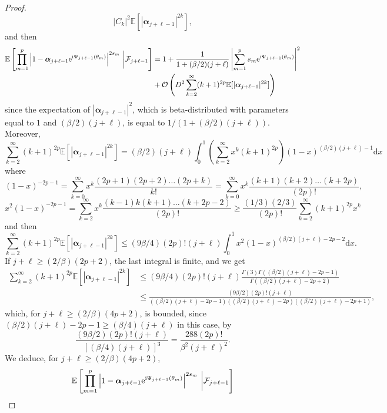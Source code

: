 \documentclass[]{article}
\begin{document}
\begin{proof}
$$|C_k|^2 \mathbb{E}[ |\boldsymbol{\alpha}_{j+\ell-1} |^{2k} ],$$
and then 
\begin{align*}\mathbb{E} \left[ \prod_{m=1}^p \left| 1 -  \boldsymbol{\alpha}_{j+\ell-1} \mathrm{e}^{\textnormal{i} \Psi_{j+ \ell - 1} (\theta_m) }\right|^{2s_m} \, \bigg| \mathcal{F}_{j+ \ell-1} \right] 
& = 1 + \frac{1}{ 1 + (\beta/2)(j+\ell)} \left|\sum_{m=1}^{p} s_m \mathrm{e}^{\textnormal{i} \Psi_{j+ \ell - 1} (\theta_m) }\right|^2
\\ & + \mathcal{O} \left( D^2 \sum_{k=2}^{\infty}
(k+1)^{2p} \mathbb{E}[ |\boldsymbol{\alpha}_{j+\ell-1} |^{2k}]
\right)
\end{align*}
since the expectation of 
$|\boldsymbol{\alpha}_{j+\ell-1}|^2$, which is beta-distributed with parameters equal to $1$ and $(\beta/2)(j+\ell)$, is equal to $1/ (1 + (\beta/2)(j+\ell))$. 
Moreover, 
$$\sum_{k=2}^{\infty} (k+1)^{2p}
 \mathbb{E}[ |\boldsymbol{\alpha}_{j+\ell-1} |^{2k}]
 = (\beta/2)(j+\ell) 
 \int_0^1 \left(\sum_{k = 2}^{\infty} x^k (k+1)^{2p}\right)  (1-x)^{(\beta/2)(j+\ell)  - 1}  \mathrm{d}x
$$
where 
$$(1-x)^{-2p-1}
= \sum_{k=0}^{\infty} x^k
\frac{(2p+1)(2p+2) \dots (2p+k)}{k!}
= \sum_{k=0}^{\infty} x^k
\frac{(k+1)(k+2) \dots (k+2p)}{(2p)!},
$$
$$x^2 (1-x)^{-2p-1} = 
\sum_{k=2}^{\infty} x^k
\frac{(k-1)k(k+1) \dots (k+2p-2)}{(2p)!}
\geq \frac{(1/3)(2/3)}{(2p)!}
\sum_{k=2}^{\infty} (k+1)^{2p} x^k
$$
and then
$$\sum_{k=2}^{\infty} (k+1)^{2p}
 \mathbb{E}[ |\boldsymbol{\alpha}_{j+\ell-1} |^{2k}]
 \leq (9 \beta/4) (2p)! (j+\ell) 
 \int_0^{1} x^2 (1 - x)^{(\beta/2)(j+\ell) - 2p-2} \mathrm{d}x.
 $$
If $j + \ell \geq (2/\beta)(2p+2)$, the last integral is finite, and 
we get 
\begin{align*}\sum_{k=2}^{\infty} (k+1)^{2p}
 \mathbb{E}[ |\boldsymbol{\alpha}_{j+\ell-1} |^{2k}]
 & \leq (9 \beta/4) (2p)! (j+\ell)  
 \frac{ \Gamma(3) \Gamma((\beta/2)(j+\ell) - 2p - 1)}{\Gamma((\beta/2)(j+\ell) - 2p +2 )}
 \\ & \leq \frac{ (9 \beta/2) (2p)! (j+\ell)}{
 ((\beta/2)(j+\ell) - 2p -1 )
 ((\beta/2)(j+\ell) - 2p  )((\beta/2)(j+\ell) - 2p +1 )},
 \end{align*}
which, for $j+\ell \geq (2/\beta)(4p + 2)$, 
is bounded, since $(\beta/2)(j+\ell) - 2p-1
\geq (\beta/4)(j+\ell)$ in this case, by
$$\frac{ (9 \beta/2) (2p)! (j+\ell)}{
 [(\beta/4)(j+\ell)]^3 }
 = \frac{288 (2p)!}{\beta^2 (j+\ell)^2}.$$
We deduce, 
for $j+\ell \geq (2/\beta)(4p+2)$, 
\begin{align*}\mathbb{E} \left[ \prod_{m=1}^p \left| 1 -  \boldsymbol{\alpha}_{j+\ell-1} \mathrm{e}^{\textnormal{i} \Psi_{j+ \ell - 1} (\theta_m) }\right|^{2s_m} \, \bigg| \mathcal{F}_{j+ \ell-1} \right] 

\end{align*}
\end{proof}
\end{document}
